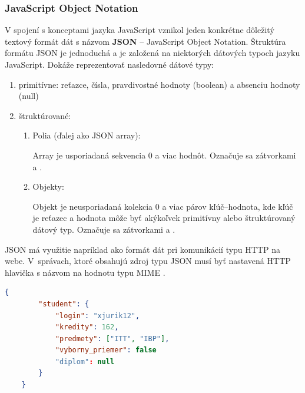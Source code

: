 
\subsubsection{JavaScript Object Notation}
\label{json}

V spojení s konceptami jazyka JavaScript vznikol jeden konkrétne dôležitý textový formát dát s názvom \textbf{JSON} -- JavaScript Object Notation.
Štruktúra formátu JSON je jednoduchá a je založená na niektorých dátových typoch jazyku JavaScript.
Dokáže reprezentovať nasledovné dátové typy:
\begin{enumerate}
    \item primitívne: reťazce, čísla, pravdivostné hodnoty (boolean) a absenciu hodnoty (null)
    
    \item štruktúrované: 
    \begin{enumerate}
        \item Polia (ďalej ako JSON array):

        Array je usporiadaná sekvencia 0 a viac hodnôt. Označuje sa zátvorkami \code{[} a \code{]}. 

        \pagebreak

        \item Objekty:

        Objekt je neusporiadaná kolekcia 0 a viac párov kľúč--hodnota, kde kľúč je reťazec
        a hodnota môže byť akýkoľvek primitívny alebo štruktúrovaný dátový typ.
        Označuje sa zátvorkami \code{\{} a \code{\}}.
    \end{enumerate}
\end{enumerate}

JSON má využitie napríklad ako formát dát pri komunikácií typu HTTP na webe.
\mbox{V správach}, ktoré obsahujú zdroj typu JSON musí byť nastavená HTTP hlavička s názvom  na hodnotu typu MIME .

\begin{center}
\centering
\begin{lstlisting}[caption={\centering Príklad dokumentu JSON. Položka \code{"student"} predstavuje JSON kľúč, ktorého hodnotou je štruktúrovaný dátový typ objekt. Názornú ukážku dátového typu pole predstavuje hodnota priradená kľúču \code{"predmety"}.},
label=listing:priklad-dokumentu-json, 
language=json, 
frame=tb,
xleftmargin=.15\textwidth, 
xrightmargin=.15\textwidth]
    {       
        "student": {
            "login": "xjurik12",
            "kredity": 162,
            "predmety": ["ITT", "IBP"],
            "vyborny_priemer": false
            "diplom": null
        }
    }
\end{lstlisting}
\end{center}

